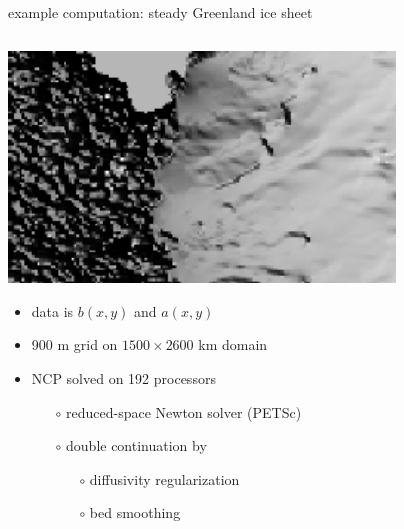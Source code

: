 \documentclass[hide notes,intlimits]{beamer}
\begin{document}
\begin{frame}{example computation: steady Greenland ice sheet}
\begin{columns}
\begin{column}{0.6\textwidth}
\includegraphics[width=1.05\textwidth]{insetinset}
\vfill
\begin{itemize}
\small
\item data is $b(x,y)$ and $a(x,y)$
\item 900 m grid on $1500\times 2600$ km domain
\item NCP solved on 192 processors
  \begin{itemize}
  \scriptsize
  \item[$\circ$] reduced-space Newton solver (PETSc)
  \item[$\circ$] double continuation by
    \begin{itemize}
    \scriptsize
    \item[$\circ$] diffusivity regularization
    \item[$\circ$] bed smoothing
    \end{itemize}
  \end{itemize}
\end{itemize}
\end{column}
\begin{column}{0.4\textwidth}

\end{column}
\end{columns}
\end{frame}
\end{document}
